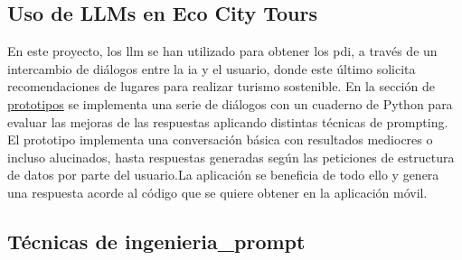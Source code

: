 	\subsection{Uso de LLMs en Eco City Tours}
	
	En este proyecto, los \acrlong{llm} se han utilizado para obtener los \acrfull{pdi}, a través de un intercambio de diálogos entre la \acrlong{ia} y el usuario, donde este último solicita recomendaciones de lugares para realizar turismo sostenible.
	En la sección de \href{https://github.com/fps1001/TFGII_FPisot/tree/main/project-prototypes/README.md}{prototipos} se implementa una serie de diálogos con un cuaderno de Python para evaluar las mejoras de las respuestas aplicando distintas técnicas de prompting\cite{promptingguide}. El prototipo implementa una conversación básica con resultados mediocres o incluso alucinados, hasta respuestas generadas según las peticiones de estructura de datos por parte del usuario.La aplicación se beneficia de todo ello y genera una respuesta acorde al código que se quiere obtener en la aplicación móvil.
	
	\subsection{Técnicas de \gls{ingenieria_prompt}}
